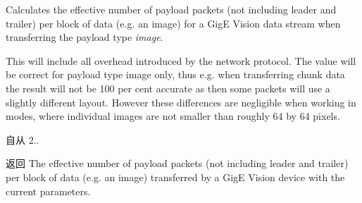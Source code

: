 Calculates the effective number of payload packets (not including leader and trailer) per block of data (e.\+g. an image) for a Gig\+E Vision data stream when transferring the payload type {\itshape image}. 

This will include all overhead introduced by the network protocol. The value will be correct for payload type image only, thus e.\+g. when transferring chunk data the result will not be 100 per cent accurate as then some packets will use a slightly different layout. However these differences are negligible when working in modes, where individual images are not smaller than roughly 64 by 64 pixels. \begin{DoxySince}{自从}
2.. 
\end{DoxySince}
\begin{DoxyReturn}{返回}
The effective number of payload packets (not including leader and trailer) per block of data (e.\+g. an image) transferred by a Gig\+E Vision device with the current parameters. 
\end{DoxyReturn}

